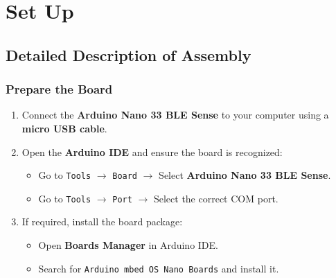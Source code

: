 %
%

\chapter{Set Up}

\section{Detailed Description of Assembly}

\subsection{Prepare the Board}
\begin{enumerate}
	\item Connect the \textbf{Arduino Nano 33 BLE Sense} to your computer using a \textbf{micro USB cable}.
	\item Open the \textbf{Arduino IDE} and ensure the board is recognized:
	\begin{itemize}
		\item Go to \texttt{Tools} $\to$ \texttt{Board} $\to$ Select \textbf{Arduino Nano 33 BLE Sense}.
		\item Go to \texttt{Tools} $\to$ \texttt{Port} $\to$ Select the correct COM port.
	\end{itemize}
	\item If required, install the board package:
	\begin{itemize}
		\item Open \textbf{Boards Manager} in Arduino IDE.
		\item Search for \texttt{Arduino mbed OS Nano Boards} and install it.
	\end{itemize}
\end{enumerate}

